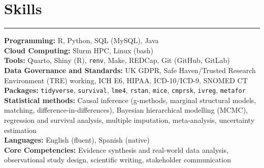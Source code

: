 \section{Skills}
\vspace{-1.5em}
\textcolor{darkgray}{\rule{\textwidth}{0.5pt}}
\textbf{Programming:} R, Python, SQL (MySQL), Java \\
\textbf{Cloud Computing:} Slurm HPC, Linux (bash) \\
\textbf{Tools:} Quarto, Shiny (R), \texttt{renv}, Make, REDCap, Git (GitHub, GitLab) \\
\textbf{Data Governance and Standards:} UK GDPR, Safe Haven/Trusted Research Environment (TRE) working, ICH E6, HIPAA, ICD-10/ICD-9, SNOMED CT \\
\textbf{Packages:} \texttt{tidyverse}, \texttt{survival}, \texttt{lme4}, \texttt{rstan}, \texttt{mice}, \texttt{cmprsk}, \texttt{ivreg}, \texttt{metafor} \\
\textbf{Statistical methods:} Causal inference (g-methods, marginal structural models, matching, difference-in-differences), Bayesian hierarchical modelling (MCMC), regression and survival analysis, multiple imputation, meta-analysis, uncertainty estimation \\
\textbf{Languages:} English (fluent), Spanish (native) \\
\textbf{Core Competencies:} Evidence synthesis and real-world data analysis, observational study design, scientific writing, stakeholder communication
